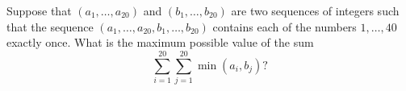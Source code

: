 Suppose that $(a_1,\ldots,a_{20})$ and $(b_1,\ldots,b_{20})$ are two sequences of integers such that the sequence $(a_1,\ldots,a_{20},b_1,\ldots,b_{20})$ contains each of the numbers $1,\ldots,40$ exactly once.  What is the maximum possible value of the sum \[\sum_{i=1}^{20}\sum_{j=1}^{20}\min(a_i,b_j)?\]
